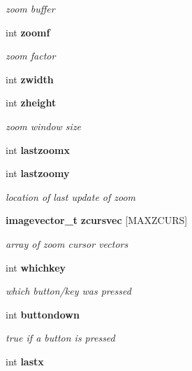 \begin{CompactItemize}
\begin{CompactList}\small\item\em zoom buffer \item\end{CompactList}\item 
int {\bf zoomf}\label{xtvutils_8c_a144}

\begin{CompactList}\small\item\em zoom factor \item\end{CompactList}\item 
int {\bf zwidth}\label{xtvutils_8c_a145}

\item 
int {\bf zheight}\label{xtvutils_8c_a146}

\begin{CompactList}\small\item\em zoom window size \item\end{CompactList}\item 
int {\bf lastzoomx}\label{xtvutils_8c_a147}

\item 
int {\bf lastzoomy}\label{xtvutils_8c_a148}

\begin{CompactList}\small\item\em location of last update of zoom \item\end{CompactList}\item 
{\bf imagevector\_\-t} {\bf zcursvec} [MAXZCURS]\label{xtvutils_8c_a149}

\begin{CompactList}\small\item\em array of zoom cursor vectors \item\end{CompactList}\item 
int {\bf whichkey}\label{xtvutils_8c_a150}

\begin{CompactList}\small\item\em which button/key was pressed \item\end{CompactList}\item 
int {\bf buttondown}\label{xtvutils_8c_a151}

\begin{CompactList}\small\item\em true if a button is pressed \item\end{CompactList}\item 
int {\bf lastx}\label{xtvutils_8c_a152}


\end{CompactItemize}
